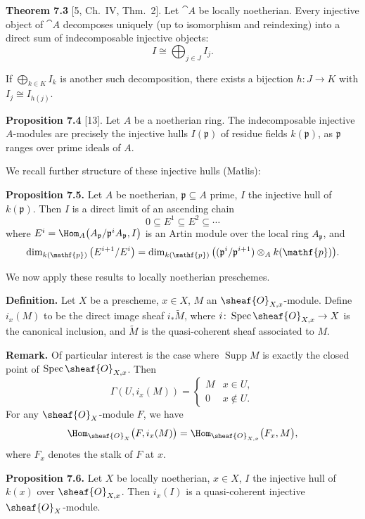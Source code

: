 \textbf{Theorem 7.3} [5, Ch.\ IV, Thm.\ 2].
Let $\cat{A}$ be locally noetherian. Every injective object of $\cat{A}$ decomposes uniquely (up to isomorphism and reindexing) into a direct sum of indecomposable injective objects:
\[
I \cong \bigoplus_{j\in J} I_j.
\]

\setcounter{page}{122}
If $\bigoplus_{k\in K}I_k$ is another such decomposition, there exists a bijection $h\colon J\to K$ with $I_j\cong I_{h(j)}$.

\textbf{Proposition 7.4} [13].
Let $A$ be a noetherian ring. The indecomposable injective $A$-modules are precisely the injective hulls $I(\mathfrak{p})$ of residue fields $k(\mathfrak{p})$, as $\mathfrak{p}$ ranges over prime ideals of $A$.

We recall further structure of these injective hulls (Matlis):

\textbf{Proposition 7.5.}
Let $A$ be noetherian, $\mathfrak{p}\subseteq A$ prime, $I$ the injective hull of $k(\mathfrak{p})$. Then $I$ is a direct limit of an ascending chain
\[
0\subseteq E^1\subseteq E^2\subseteq\cdots
\]
where $E^i = \Hom_A\big(A_\mathfrak{p}/\mathfrak{p}^iA_\mathfrak{p},I\big)$ is an Artin module over the local ring $A_\mathfrak{p}$, and
\[
\dim_{k(\mathf{p})}\big(E^{i+1}/E^i\big)
= \dim_{k(\mathf{p})}\big((\mathfrak{p}^i/\mathfrak{p}^{i+1})\otimes_A k(\mathf{p})\big).
\]

\setcounter{page}{123}
We now apply these results to locally noetherian preschemes.

\textbf{Definition.}
Let $X$ be a prescheme, $x\in X$, $M$ an $\sheaf{O}_{X,x}$-module. Define $i_x(M)$ to be the direct image sheaf $i_*\widetilde{M}$, where $i\colon\operatorname{Spec}\sheaf{O}_{X,x}\to X$ is the canonical inclusion, and $\widetilde{M}$ is the quasi-coherent sheaf associated to $M$.

\textbf{Remark.}
Of particular interest is the case where $\operatorname{Supp}M$ is exactly the closed point of $\operatorname{Spec}\sheaf{O}_{X,x}$. Then
\[
\Gamma(U,i_x(M)) =
\begin{cases}
M & x\in U,\\
0 & x\notin U.
\end{cases}
\]
For any $\sheaf{O}_X$-module $F$, we have
\[
\Hom_{\sheaf{O}_X}\big(F,i_x(M)\big)
= \Hom_{\sheaf{O}_{X,x}}\big(F_x,M\big),
\]
where $F_x$ denotes the stalk of $F$ at $x$.

\textbf{Proposition 7.6.}
Let $X$ be locally noetherian, $x\in X$, $I$ the injective hull of $k(x)$ over $\sheaf{O}_{X,x}$. Then $i_x(I)$ is a quasi-coherent injective $\sheaf{O}_X$-module.

